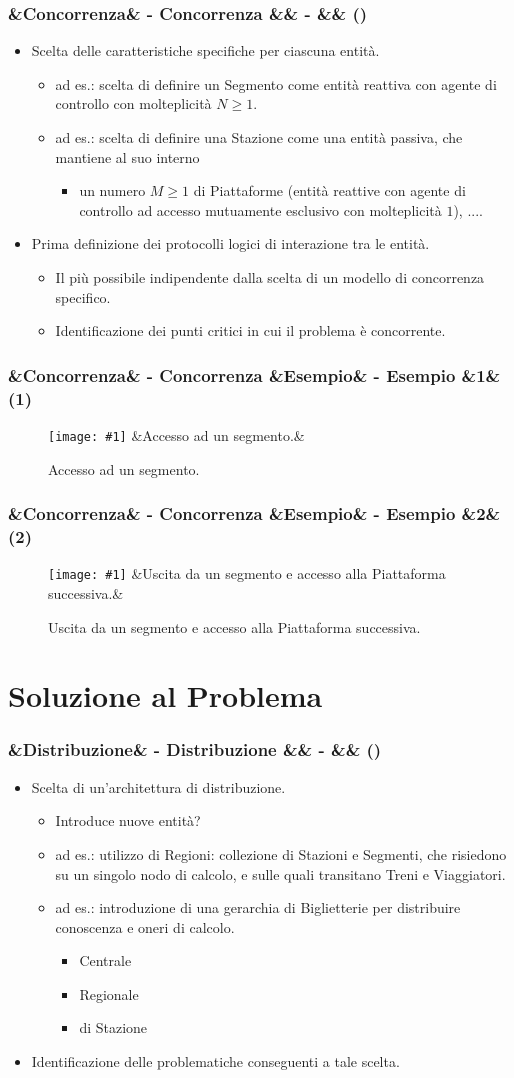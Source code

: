 \documentclass[slidestop,compress,blackandwhite]{beamer}
\newcommand{\newtitle}[4]{
	#1 
	\ifx&#2&%
	\else
  		\large- #2
	\fi
	\ifx&#3&%
	\else
  		\normalsize- #3
	\fi
	\ifx&#4&%
	\else
  		\normalsize (#4)
	\fi
}
\newcommand{\newframe}[5]{
	\begin{frame}
		\frametitle{\newtitle{#1}{#2}{#3}{#4}}
		#5
	\end{frame}
}
\newcommand{\myitemize}[1]{
	\begin{itemize}\itemsep4pt
	#1
	\end{itemize}
}
\newcommand{\newfigure}[3]{
	\begin{figure}
		\centering
		\texttt{[image: \#1]}
		\ifx&#3&%
		\else
	  		\caption{\scriptsize #3}
		\fi
	\end{figure}
}
\begin{document}

	
	\newframe{}{Concorrenza}{}{}{
		
		\myitemize {
			\item Scelta delle caratteristiche specifiche per ciascuna entità.
				\myitemize {
					\item ad es.: scelta di definire un Segmento come entità reattiva con agente di controllo con molteplicità $N\ge1$.
					\item ad es.: scelta di definire una Stazione come una entità passiva, che mantiene al suo interno
						\myitemize {
							\item un numero $M\ge1$ di Piattaforme (entità reattive con agente di controllo ad accesso mutuamente esclusivo con molteplicità $1$),	....
						}
				}
			\item Prima definizione dei protocolli logici di interazione tra le entità.%
				\myitemize {
					\item Il più possibile indipendente dalla scelta di un modello di concorrenza specifico.
					\item Identificazione dei punti critici in cui il problema è concorrente.
				}
				
		}
		
	}
	
	\newframe{}{Concorrenza}{Esempio}{1}{
		\newfigure{imgs/ingresso_segmento}{0.5}{Accesso ad un segmento.}
	}
	
	\newframe{}{Concorrenza}{Esempio}{2}{
		\newfigure{imgs/ingresso_stazione}{0.5}{Uscita da un segmento e accesso alla Piattaforma successiva.}
	}
	
	
	
\section{Soluzione al Problema}\label{sol}

	\newframe{}{Distribuzione}{}{} {
		\myitemize {
			\item Scelta di un'architettura di distribuzione.
				\myitemize {
					\item Introduce nuove entità?
					\item ad es.: utilizzo di Regioni: collezione di Stazioni e Segmenti, che risiedono su un singolo nodo di calcolo, e sulle quali transitano Treni e Viaggiatori.
					\item ad es.: introduzione di una gerarchia di Biglietterie per distribuire conoscenza e oneri di calcolo.
						\myitemize {
							\item Centrale
							\item Regionale
							\item di Stazione
						}
				}
			\item Identificazione delle problematiche conseguenti a tale scelta.
				
		}
	}
\end{document}
